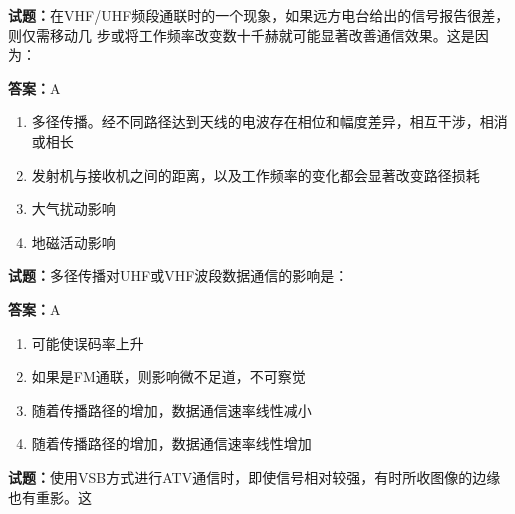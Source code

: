 \documentclass{ctexbook}
\begin{document}




\vspace{1em}

\textbf{试题：}在VHF/UHF频段通联时的一个现象，如果远方电台给出的信号报告很差，则仅需移动几
步或将工作频率改变数十千赫就可能显著改善通信效果。这是因为： 

\textbf{答案：}A 

\begin{enumerate}[leftmargin=3em]
  \item 多径传播。经不同路径达到天线的电波存在相位和幅度差异，相互干涉，相消或相长 

  \item 发射机与接收机之间的距离，以及工作频率的变化都会显著改变路径损耗 

  \item 大气扰动影响 

  \item 地磁活动影响 

\end{enumerate}





\vspace{1em}

\textbf{试题：}多径传播对UHF或VHF波段数据通信的影响是： 

\textbf{答案：}A 

\begin{enumerate}[leftmargin=3em]
  \item 可能使误码率上升 

  \item 如果是FM通联，则影响微不足道，不可察觉 

  \item 随着传播路径的增加，数据通信速率线性减小 

  \item 随着传播路径的增加，数据通信速率线性增加 

\end{enumerate}





\vspace{1em}

\textbf{试题：}使用VSB方式进行ATV通信时，即使信号相对较强，有时所收图像的边缘也有重影。这
\end{document}
